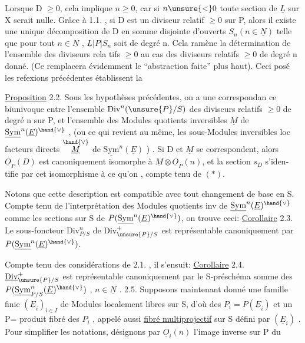 
Lorsque D $\geq 0$, cela implique $n \geq 0$, car si  $n \unsure{<} 0$ toute section de
$\underline{L}$ sur X serait nulle. Grâce à 1.1. , si D est un diviseur relatif
$\geq 0$ sur P, alors il existe une unique décomposition de D en somme
disjointe d'ouverts $S_n (n \in \underline{N})$ telle que pour tout $n \in \underline{N}$ , $\underline{L}|P|S_n$ soit de
degré n. Cela ramène la détermination de l'ensemble des diviseurs rela%
tifs $\geq 0$ au cas des diviseurs relatifs $\geq 0$ de degré n donné. (Ce
\margin{$/\!/$}  remplacera évidemment le ``abstraction faite'' plus haut). Ceci posé
les refexions précédentes établissent la

\uline{Proposition} 2.2. Sous les hypothèses précédentes, on a une correspondan%
ce biunivoque entre l'ensemble $\mathrm{Div}^{n}(\unsure{P}/S)$ des diviseurs relatifs $\geq 0$ de
degré n sur P, et l'ensemble des Modules quotients inversibles $\underline{M}$ de
$\underline{\mathrm{Sym}}^{n}(\underline{E})^{\hand{\vee}}$ , (ou ce qui revient au même, les sous-Modules inversibles loc
facteurs directs $\overset{\hand{\vee}}{\underline{M}}$ de $\underline{\mathrm{Sym}}^{n}(\underline{E})$ ) . Si D et $\underline{M}$ se correspondent, alors
$\underline{O}_P(D)$ est canoniquement isomorphe à $\underline{M}\otimes\underline{O}_P(n)$, et la section $s_D$ s'iden-%
tifie par cet isomorphisme à ce qu'on , compte tenu de $(*)$.

Notons que cette description est compatible avec tout changement de
base en S. Compte tenu de l'interprétation des Modules quotients inv de
$\underline{\mathrm{Sym}}^{n}(\underline{E})^{\hand{\vee}}$ comme les sections sur S de $P(\underline{\mathrm{Sym}}^{n}(\underline{E})^{\hand{\vee}})$, on trouve ceci:
\uline{Corollaire} 2.3. Le sous-foncteur  $\mathrm{Div}^{n}_{P/S}$ de $\mathrm{Div}^{+}_{\unsure{P}/S}$ est représentable
canoniquement par $P(\underline{\mathrm{Sym}}^{n}(\underline{E})^{\hand{\vee}})$.

Compte tenu des considérations de 2.1. , il s'ensuit:
\uline{Corollaire} 2.4. $\underline{\mathrm{Div}}^{+}_{\unsure{P}/S}$ est représentable canoniquement  par
le S-préschéma somme des $P(\underline{\mathrm{Sym}}^{n}_{P/S}(\underline{E})^{\hand{\vee}})$ , $n \in \underline{N}$ .
2.5. Supposons maintenant donné une famille finie $(\underline{E}_i)_{i \in I}$ de Modules
localement libres sur S, d'où des $P_i = P(\underline{E}_i)$ et un P= produit fibré des
$P_i$ , appelé aussi \uline{fibré multiprojectif} sur S défini par $(\underline{E}_i)$ . Pour
simplifier les notations, désignons par $\underline{O}_i(n)$ l'image inverse sur P du

